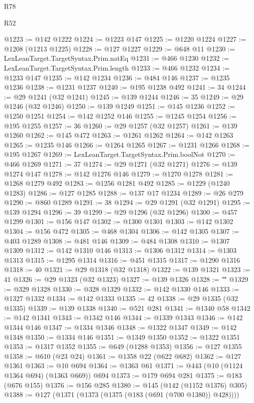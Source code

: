 \begin{lexlean}{R78}
\begin{lexlean}{R52}
\begin{coremodule}
{{{{{{{{{{{{{{{{{{{{{{{{{{{{{{{{{{{{{{{{{{{{{{{{{{{{{{{{{{{{{{{{{{{{{{{{{{{{{{{{{{{{{{{{{{{{{{{{{{{{{{{{{{{{{{{{{{{{{{{{{{{{{{{{{{{{{{{{{{{{{{{{{{{{{{{{{{{{{{{{{{{{{{{{{{{{{{{{{{{{{{{{{{{{{{{{{{{{{{@1223 := @142 @1222
@1224 := @1223 @147
@1225 := @1220 @1224
@1227 := @1208 (@1213 @1225)
@1228 := @127 @1227
@1229 := @648 @11
@1230 := LexLeanTarget.TargetSyntax.Prim.natEq
@1231 := @466 @1230
@1232 := LexLeanTarget.TargetSyntax.Prim.length
@1233 := @466 @1232
@1234 := @1233 @147
@1235 := @142 @1234
@1236 := @484 @146
@1237 := @1235 @1236
@1238 := @1231 @1237
@1240 := @195 @1238 @492
@1241 := 34
@1244 := @29 @1241 (@32 @1241)
@1245 := @139 @1244
@1246 := 35
@1249 := @29 @1246 (@32 @1246)
@1250 := @139 @1249
@1251 := @145 @1236
@1252 := @1250 @1251
@1254 := @142 @1252 @146
@1255 := @1245 @1254
@1256 := @195 @1255
@1257 := 36
@1260 := @29 @1257 (@32 @1257)
@1261 := @139 @1260
@1262 := @145 @472
@1263 := @1261 @1262
@1264 := @142 @1263
@1265 := @1235 @146
@1266 := @1264 @1265
@1267 := @1231 @1266
@1268 := @195 @1267
@1269 := LexLeanTarget.TargetSyntax.Prim.boolNot
@1270 := @466 @1269
@1271 := 37
@1274 := @29 @1271 (@32 @1271)
@1276 := @139 @1274 @147
@1278 := @142 @1276 @146
@1279 := @1270 @1278
@1281 := @1268 @1279 @492
@1283 := @1256 @1281 @492
@1285 := @1229 (@1240 @1283)
@1286 := @127 @1285
@1288 := @137 @17 @1234
@1289 := @26 @279
@1290 := @860 @1289
@1291 := 38
@1294 := @29 @1291 (@32 @1291)
@1295 := @139 @1294
@1296 := 39
@1299 := @29 @1296 (@32 @1296)
@1300 := @457 @1299
@1301 := @156 @147
@1302 := @1300 @1301
@1303 := @142 @1302
@1304 := @156 @472
@1305 := @468 @1304
@1306 := @142 @1305
@1307 := @403 @1289
@1308 := @481 @146
@1309 := @484 @1308
@1310 := @1307 @1309
@1312 := @142 @1310 @146
@1313 := @1306 @1312
@1314 := @1303 @1313
@1315 := @1295 @1314
@1316 := @451 @1315
@1317 := @1290 @1316
@1318 := 40
@1321 := @29 @1318 (@32 @1318)
@1322 := @139 @1321
@1323 := 41
@1326 := @29 @1323 (@32 @1323)
@1327 := @139 @1326
@1328 := "\""
@1329 := @329 @1328
@1330 := @328 @1329
@1332 := @142 @1330 @146
@1333 := @1327 @1332
@1334 := @142 @1333
@1335 := 42
@1338 := @29 @1335 (@32 @1335)
@1339 := @139 @1338
@1340 := @521 @281
@1341 := @1340 @58
@1342 := @142 @1341
@1343 := @1342 @146
@1344 := @1339 @1343
@1346 := @142 @1344 @146
@1347 := @1334 @1346
@1348 := @1322 @1347
@1349 := @142 @1348
@1350 := @1334 @146
@1351 := @1349 @1350
@1352 := @1322 @1351
@1353 := @1317 @1352
@1355 := @649 (@1288 @1353)
@1356 := @127 @1355
@1358 := @610 (@23 @24)
@1361 := @1358 @22 (@622 @682)
@1362 := @127 @1361
@1363 := @10 @694
@1364 := @1363 @61
@1371 := @443 (@10 (@1124 @1364 @694) (@1363 @669)) @694
@1373 := @179 @694 @281
@1375 := @183 (@676 @155)
@1376 := @156 @285
@1380 := @145 (@142 (@1152 @1376) @305)
@1388 := @127 (@1371 (@1373 (@1375 (@183 (@691 (@700 @1380)) @428))))
}}}}}}}}}}}}}}}}}}}}}}}}}}}}}}}}}}}}}}}}}}}}}}}}}}}}}}}}}}}}}}}}}}}}}}}}}}}}}}}}}}}}}}}}}}}}}}}}}}}}}}}}}}}}}}}}}}}}}}}}}}}}}}}}}}}}}}}}}}}}}}}}}}}}}}}}}}}}}}}}}}}}}}}}}}}}}}}}}}}}}}}}}}}}}}}}}}}}}}
\end{coremodule}
\end{lexlean}
\end{lexlean}
